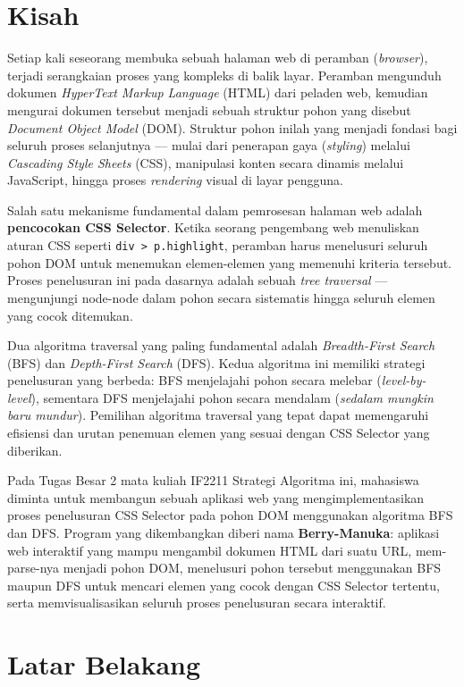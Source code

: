 \section{Kisah}

Setiap kali seseorang membuka sebuah halaman web di peramban (\textit{browser}),
terjadi serangkaian proses yang kompleks di balik layar. Peramban mengunduh
dokumen \textit{HyperText Markup Language} (HTML) dari peladen web, kemudian
mengurai dokumen tersebut menjadi sebuah struktur pohon yang disebut
\textit{Document Object Model} (DOM). Struktur pohon inilah yang menjadi
fondasi bagi seluruh proses selanjutnya --- mulai dari penerapan gaya
(\textit{styling}) melalui \textit{Cascading Style Sheets} (CSS), manipulasi
konten secara dinamis melalui JavaScript, hingga proses \textit{rendering}
visual di layar pengguna.

Salah satu mekanisme fundamental dalam pemrosesan halaman web adalah
\textbf{pencocokan CSS Selector}. Ketika seorang pengembang web menuliskan
aturan CSS seperti \texttt{div > p.highlight}, peramban harus menelusuri
seluruh pohon DOM untuk menemukan elemen-elemen yang memenuhi kriteria
tersebut. Proses penelusuran ini pada dasarnya adalah sebuah \textit{tree
traversal} --- mengunjungi node-node dalam pohon secara sistematis hingga
seluruh elemen yang cocok ditemukan.

Dua algoritma traversal yang paling fundamental adalah \textit{Breadth-First
Search} (BFS) dan \textit{Depth-First Search} (DFS). Kedua algoritma ini
memiliki strategi penelusuran yang berbeda: BFS menjelajahi pohon
secara melebar (\textit{level-by-level}), sementara DFS menjelajahi pohon
secara mendalam (\textit{sedalam mungkin baru mundur}). Pemilihan algoritma
traversal yang tepat dapat memengaruhi efisiensi dan urutan penemuan elemen
yang sesuai dengan CSS Selector yang diberikan.

Pada Tugas Besar 2 mata kuliah IF2211 Strategi Algoritma ini, mahasiswa
diminta untuk membangun sebuah aplikasi web yang mengimplementasikan proses
penelusuran CSS Selector pada pohon DOM menggunakan algoritma BFS dan DFS.
Program yang dikembangkan diberi nama \textbf{Berry-Manuka}: aplikasi web
interaktif yang mampu mengambil dokumen HTML dari suatu URL, mem-parse-nya
menjadi pohon DOM, menelusuri pohon tersebut menggunakan BFS maupun DFS untuk
mencari elemen yang cocok dengan CSS Selector tertentu, serta memvisualisasikan
seluruh proses penelusuran secara interaktif.

\section{Latar Belakang}

